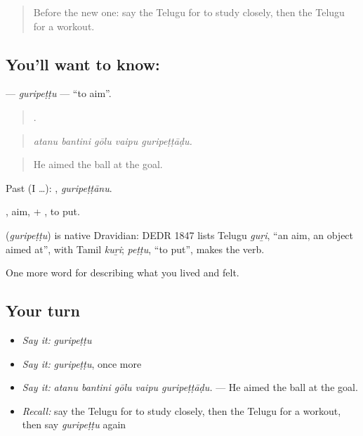 \label{lesson:TE-C545-guripettu}



\begin{quote}
Before the new one: say the Telugu for to study closely, then the Telugu for a workout.
\end{quote}

\subsection*{You'll want to know: }
\textbf{} — \emph{guripeṭṭu} — \textquotedblleft{}to aim\textquotedblright{}.

\begin{quote}
    .
\end{quote}

\begin{quote}
\emph{atanu bantini gōlu vaipu guripeṭṭāḍu.}
\end{quote}

\begin{quote}
He aimed the ball at the goal.
\end{quote}

Past (I …): , \emph{guripeṭṭānu}.

, aim, + , to put.

\begin{cousinweb}
\textbf{} (\emph{guripeṭṭu}) is native Dravidian: DEDR 1847 lists Telugu \emph{guṟi}, \textquotedblleft{}an aim, an object aimed at\textquotedblright{}, with Tamil \emph{kuṟi}; \emph{peṭṭu}, \textquotedblleft{}to put\textquotedblright{}, makes the verb.
\end{cousinweb}

\begin{grammarlens}[title={What you've built}]
One more word for describing what you lived and felt.
\end{grammarlens}

\subsection*{Your turn}
\begin{itemize}
\raggedright
  \item \emph{Say it:} \emph{guripeṭṭu}
  \item \emph{Say it:} \emph{guripeṭṭu}, once more
  \item \emph{Say it:} \emph{atanu bantini gōlu vaipu guripeṭṭāḍu.} — He aimed the ball at the goal.
  \item \emph{Recall:} say the Telugu for to study closely, then the Telugu for a workout, then say \emph{guripeṭṭu} again
\end{itemize}

